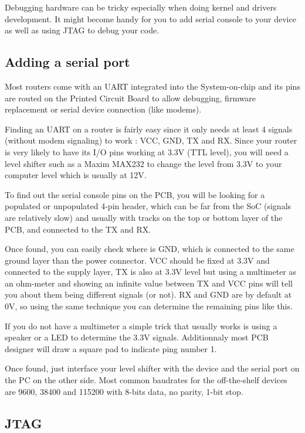 Debugging hardware can be tricky especially when doing kernel and drivers
development. It might become handy for you to add serial console to your
device as well as using JTAG to debug your code.

\subsection{Adding a serial port}

Most routers come with an UART integrated into the System-on-chip
and its pins are routed on the Printed Circuit Board to allow
debugging, firmware replacement or serial device connection (like
modems).

Finding an UART on a router is fairly easy since it only needs at
least 4 signals (without modem signaling) to work : VCC, GND, TX and
RX. Since your router is very likely to have its I/O pins working at
3.3V (TTL level), you will need a level shifter such as a Maxim MAX232
to change the level from 3.3V to your computer level which is usually
at 12V.

To find out the serial console pins on the PCB, you will be looking
for a populated or unpopulated 4-pin header, which can be far from
the SoC (signals are relatively slow) and usually with tracks on
the top or bottom layer of the PCB, and connected to the TX and RX.

Once found, you can easily check where is GND, which is connected to
the same ground layer than the power connector. VCC should be fixed
at 3.3V and connected to the supply layer, TX is also at 3.3V level
but using a multimeter as an ohm-meter and showing an infinite
value between TX and VCC pins will tell you about them being different
signals (or not). RX and GND are by default at 0V, so using the same
technique you can determine the remaining pins like this.

If you do not have a multimeter a simple trick that usually works is
using a speaker or a LED to determine the 3.3V signals. Additionnaly
most PCB designer will draw a square pad to indicate ping number 1.

Once found, just interface your level shifter with the device and the
serial port on the PC on the other side. Most common baudrates for the
off-the-shelf devices are 9600, 38400 and 115200 with 8-bits data, no
parity, 1-bit stop.

\subsection{JTAG}

